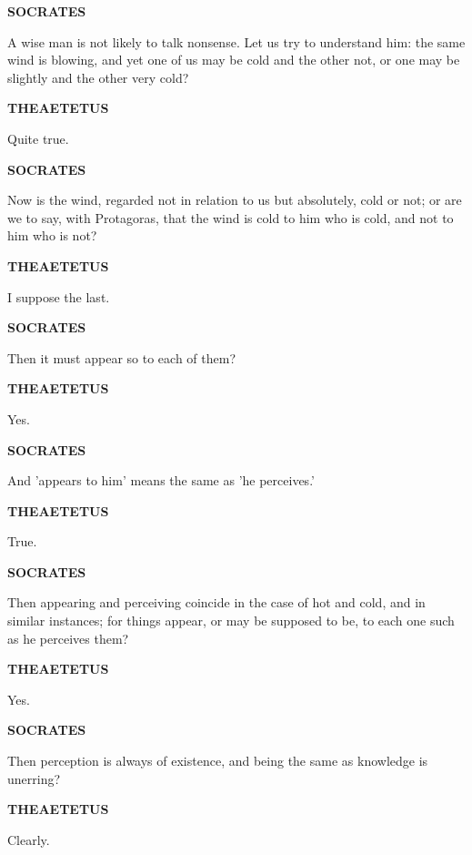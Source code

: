 \documentclass[11pt,letter]{article}
\begin{document}
\par \textbf{SOCRATES}
\par   A wise man is not likely to talk nonsense. Let us try to understand him:  the same wind is blowing, and yet one of us may be cold and the other not, or one may be slightly and the other very cold?

\par \textbf{THEAETETUS}
\par   Quite true.

\par \textbf{SOCRATES}
\par   Now is the wind, regarded not in relation to us but absolutely, cold or not; or are we to say, with Protagoras, that the wind is cold to him who is cold, and not to him who is not?

\par \textbf{THEAETETUS}
\par   I suppose the last.

\par \textbf{SOCRATES}
\par   Then it must appear so to each of them?

\par \textbf{THEAETETUS}
\par   Yes.

\par \textbf{SOCRATES}
\par   And 'appears to him' means the same as 'he perceives.'

\par \textbf{THEAETETUS}
\par   True.

\par \textbf{SOCRATES}
\par   Then appearing and perceiving coincide in the case of hot and cold, and in similar instances; for things appear, or may be supposed to be, to each one such as he perceives them?

\par \textbf{THEAETETUS}
\par   Yes.

\par \textbf{SOCRATES}
\par   Then perception is always of existence, and being the same as knowledge is unerring?

\par \textbf{THEAETETUS}
\par   Clearly.
\end{document}

